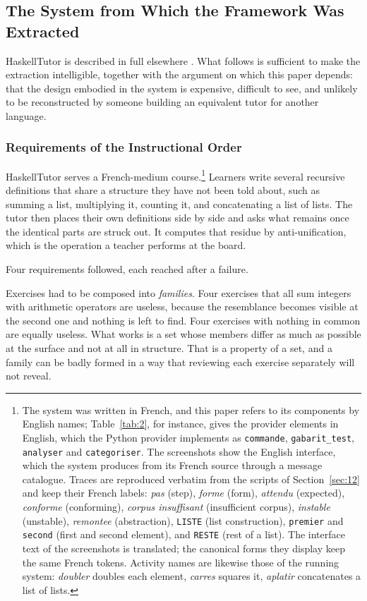 \documentclass[journal]{IEEEtran}
\begin{document}
\subsection{The System from Which the Framework Was Extracted}\label{sec:2.4}
HaskellTutor is described in full elsewhere \cite{b7}. What follows is
sufficient to make the extraction intelligible, together with the
argument on which this paper depends: that the design embodied in the
system is expensive, difficult to see, and unlikely to be reconstructed
by someone building an equivalent tutor for another language.

\subsubsection{Requirements of the Instructional Order}\label{sec:2.4.1}
HaskellTutor serves a French-medium course.\footnote{The system was written in French, and this paper
refers to its components by English names; Table~\ref{tab:2}, for instance, gives the
provider elements in English, which the Python provider implements as
\texttt{commande}, \texttt{gabarit\_test}, \texttt{analyser} and
\texttt{categoriser}. The screenshots show the English interface, which the system produces
from its French source through a message catalogue.
Traces are reproduced verbatim from the scripts of Section~\ref{sec:12} and keep
their French labels: \emph{pas} (step), \emph{forme} (form),
\emph{attendu} (expected), \emph{conforme} (conforming), \emph{corpus
insuffisant} (insufficient corpus), \emph{instable} (unstable),
\emph{remontee} (abstraction), \texttt{LISTE} (list construction),
\texttt{premier} and \texttt{second} (first and second element), and
\texttt{RESTE} (rest of a list). The interface text of the screenshots is
translated; the canonical forms they display keep the same French tokens.
Activity names are likewise those of the running system: \emph{doubler}
doubles each element, \emph{carres} squares it, \emph{aplatir}
concatenates a list of lists.} Learners write several
recursive definitions that share a structure they
have not been told about, such as summing a list, multiplying it,
counting it, and concatenating a list of lists. The tutor then places
their own definitions side by side and asks what remains once the
identical parts are struck out. It computes that residue by
anti-unification, which is the operation a teacher performs at the
board.

Four requirements followed, each reached after a failure.

Exercises had to be composed into \emph{families}. Four exercises that
all sum integers with arithmetic operators are useless, because the
resemblance becomes visible at the second one and nothing is left to
find. Four exercises with nothing in common are equally useless. What
works is a set whose members differ as much as possible at the surface
and not at all in structure. That is a property of a set, and a family
can be badly formed in a way that reviewing each exercise separately
will not reveal.
\end{document}
